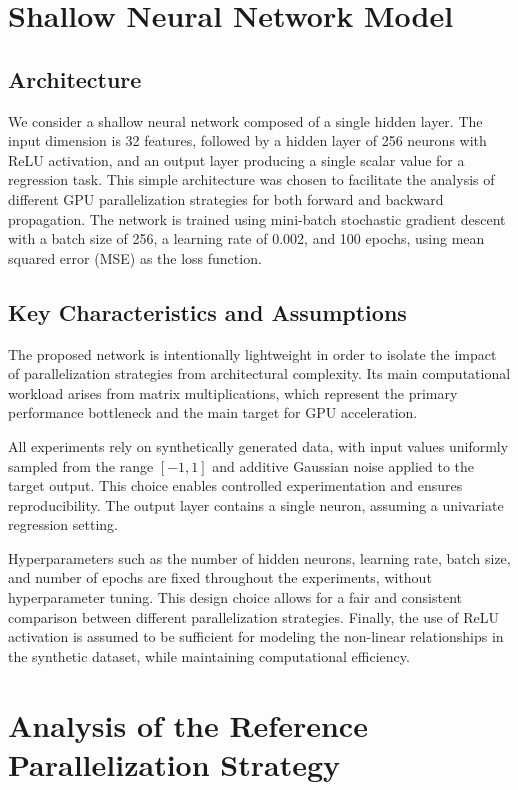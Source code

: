 \documentclass[conference, 12pt]{IEEEtran}
\begin{document}
\section{Shallow Neural Network Model}
\subsection{Architecture}
We consider a shallow neural network composed of a single hidden layer. The input dimension is 32 features, followed by a hidden layer of 256 neurons with ReLU activation, and an output layer producing a single scalar value for a regression task. This simple architecture was chosen to facilitate the analysis of different GPU parallelization strategies for both forward and backward propagation. The network is trained using mini-batch stochastic gradient descent with a batch size of 256, a learning rate of 0.002, and 100 epochs, using mean squared error (MSE) as the loss function.


\subsection{Key Characteristics and Assumptions}
The proposed network is intentionally lightweight in order to isolate the impact of parallelization strategies from architectural complexity. Its main computational workload arises from matrix multiplications, which represent the primary performance bottleneck and the main target for GPU acceleration.

All experiments rely on synthetically generated data, with input values uniformly sampled from the range $[-1,1]$ and additive Gaussian noise applied to the target output. This choice enables controlled experimentation and ensures reproducibility. The output layer contains a single neuron, assuming a univariate regression setting.

Hyperparameters such as the number of hidden neurons, learning rate, batch size, and number of epochs are fixed throughout the experiments, without hyperparameter tuning. This design choice allows for a fair and consistent comparison between different parallelization strategies. Finally, the use of ReLU activation is assumed to be sufficient for modeling the non-linear relationships in the synthetic dataset, while maintaining computational efficiency.

\section{Analysis of the Reference Parallelization Strategy}
\end{document}

